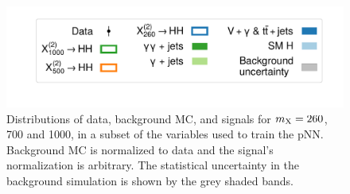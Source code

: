 \begin{figure}
    \includegraphics[width=.7\linewidth]{Figures/Dihiggs/categorisation/input_features/Graviton/Scale_equal/legend.pdf}
    \caption[Distributions of Training Features (4)]{Distributions of data, background MC, and \XTwoHH signals for $m_{\mathrm{X}}=260$, 700 and 1000\GeV, in a subset of the variables used to train the pNN. Background MC is normalized to data and the signal's normalization is arbitrary. The statistical uncertainty in the background simulation is shown by the grey shaded bands.}\label{fig:training_features_4}
\end{figure}

